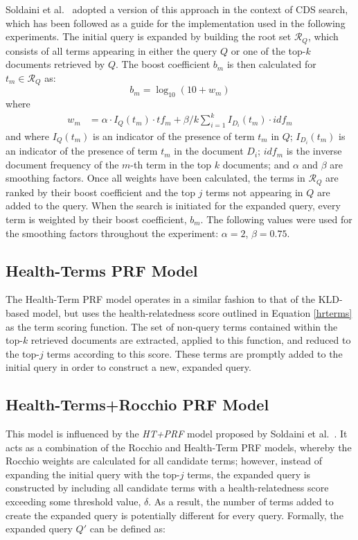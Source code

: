 \documentclass[a4paper]{report}
\begin{document}
Soldaini et al.~\cite{Soldaini2015RetrievingML} adopted a version of this approach in the context of CDS search, which has been followed as a guide for the implementation used in the following experiments. The initial query is expanded by building the root set $\mathcal{R}_Q$, which consists of all terms appearing in either the query $Q$ or one of the top-$k$ documents retrieved by $Q$. The boost coefficient $b_m$ is then calculated for $t_m \in \mathcal{R}_Q$ as: $$b_m = \log_{10}(10+w_m)$$
where 
\begin{equation}
\label{prfscore}
\begin{split}
  w_m &= \alpha \cdot I_Q(t_m) \cdot tf_m + \beta/k \sum^{k}_{i=1} I_{D_i}(t_m)\cdot idf_m
\end{split}
\end{equation}
and where $I_Q(t_m)$ is an indicator of the presence of term $t_m$ in $Q$; $I_{D_i}(t_m)$ is an indicator of the presence of term $t_m$ in the document $D_i$; $idf_m$ is the inverse document frequency of the $m$-th term in the top $k$ documents; and $\alpha$ and $\beta$ are smoothing factors. Once all weights have been calculated, the terms in $\mathcal{R}_Q$ are ranked by their boost coefficient and the top $j$ terms not appearing in $Q$ are added to the query. When the search is initiated for the expanded query, every term is weighted by their boost coefficient, $b_m$. The following values were used for the smoothing factors throughout the experiment: $\alpha = 2$, $\beta = 0.75$.

\subsection{Health-Terms PRF Model}
The Health-Term PRF model operates in a similar fashion to that of the KLD-based model, but uses the health-relatedness score outlined in Equation \ref{hrterms} as the term scoring function. The set of non-query terms contained within the top-$k$ retrieved documents are extracted, applied to this function, and reduced to the top-$j$ terms according to this score. These terms are promptly added to the initial query in order to construct a new, expanded query.

\subsection{Health-Terms+Rocchio PRF Model}
This model is influenced by the \textit{HT+PRF} model proposed by Soldaini et al.~\cite{Soldaini2015RetrievingML}. It acts as a combination of the Rocchio and Health-Term PRF models, whereby the Rocchio weights are calculated for all candidate terms; however, instead of expanding the initial query with the top-$j$ terms, the expanded query is constructed by including all candidate terms with a health-relatedness score exceeding some threshold value, $\delta$. As a result, the number of terms added to create the expanded query is potentially different for every query. Formally, the expanded query $Q'$ can be defined as:
\end{document}
